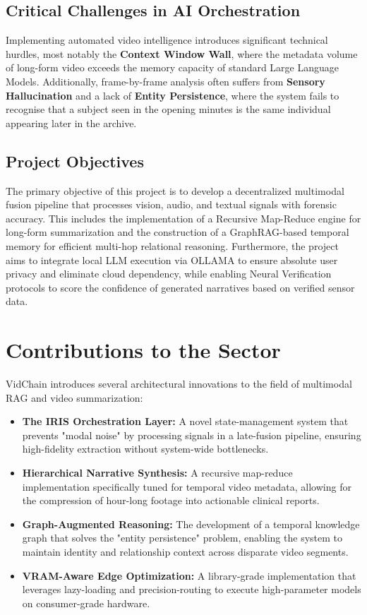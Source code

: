 \subsection{Critical Challenges in AI Orchestration}
Implementing automated video intelligence introduces significant technical hurdles, most notably the \textbf{Context Window Wall}, where the metadata volume of long-form video exceeds the memory capacity of standard Large Language Models. Additionally, frame-by-frame analysis often suffers from \textbf{Sensory Hallucination} and a lack of \textbf{Entity Persistence}, where the system fails to recognise that a subject seen in the opening minutes is the same individual appearing later in the archive. 

\subsection{Project Objectives}
The primary objective of this project is to develop a decentralized multimodal fusion pipeline that processes vision, audio, and textual signals with forensic accuracy. This includes the implementation of a Recursive Map-Reduce engine for long-form summarization and the construction of a GraphRAG-based temporal memory for efficient multi-hop relational reasoning. 
Furthermore, the project aims to integrate local LLM execution via OLLAMA to ensure absolute user privacy and eliminate cloud dependency, while enabling Neural Verification protocols to score the confidence of generated narratives based on verified sensor data.

\section{Contributions to the Sector}
VidChain introduces several architectural innovations to the field of multimodal RAG and video summarization:
\begin{itemize}
    \item \textbf{The IRIS Orchestration Layer:} A novel state-management system that prevents "modal noise" by processing signals in a late-fusion pipeline, ensuring high-fidelity extraction without system-wide bottlenecks.
    \item \textbf{Hierarchical Narrative Synthesis:} A recursive map-reduce implementation specifically tuned for temporal video metadata, allowing for the compression of hour-long footage into actionable clinical reports.
    \item \textbf{Graph-Augmented Reasoning:} The development of a temporal knowledge graph that solves the "entity persistence" problem, enabling the system to maintain identity and relationship context across disparate video segments.
    \item \textbf{VRAM-Aware Edge Optimization:} A library-grade implementation that leverages lazy-loading and precision-routing to execute high-parameter models on consumer-grade hardware.
\end{itemize}

